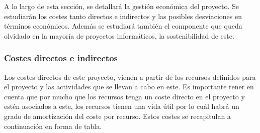 

A lo largo de esta sección, se detallará la gestión económica del proyecto. Se estudiarán los costes tanto directos e indirectos y las posibles desviaciones en términos económicos. Además se estudiará también el componente que queda olvidado en la mayoría de proyectos informáticos, la sostenibilidad de este.

\subsubsection{Costes directos e indirectos}

Los costes directos de este proyecto, vienen a partir de los recursos definidos para el proyecto y las actividades que se llevan a cabo en este. Es importante tener en cuenta que por mucho que los recursos tenga un coste directo en el proyecto y estén asociados a este, los recursos tienen una vida útil por lo cuál habrá un grado de amortización del coste por recurso. Estos costes se recapitulan a continuación en forma de tabla.

